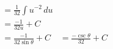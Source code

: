\documentclass[preview]{standalone}
\begin{document}
\begin{align*}
&=\frac{1}{32} \int u^{-2} \, du \\ &=\frac{-1}{32u}+C \\ &=\frac{-1}{32\sin\theta}+C &=\frac{-\csc\theta}{32}+C
\end{align*}
\end{document}
